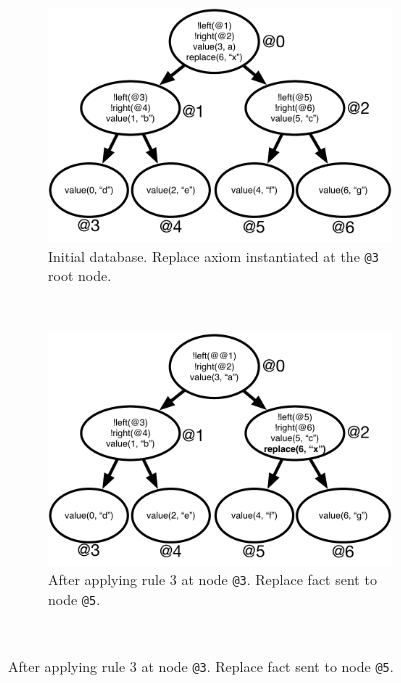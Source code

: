 \begin{figure}[h]
        \centering
        \begin{subfigure}[b]{0.5\textwidth}
                \includegraphics[width=\textwidth]{figures/btree/btree_trace1}
                \caption{Initial database. Replace axiom instantiated at the
                   \texttt{@3} root node.}
                \label{fig:btree_trace1}
        \end{subfigure}%
        ~
        \begin{subfigure}[b]{0.5\textwidth}
                \includegraphics[width=\textwidth]{figures/btree/btree_trace2}
                \caption{After applying rule 3 at node \texttt{@3}. Replace fact
                   sent to node \texttt{@5}.}
                \label{fig:btree_trace2}
        \end{subfigure}\\

\end{figure}
